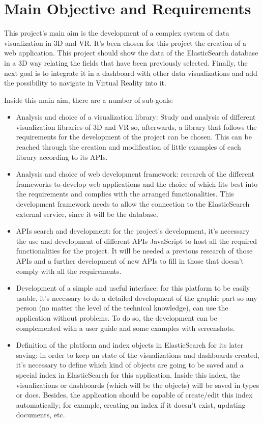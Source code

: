 \documentclass[a4paper, 12pt]{book}
\begin{document}
\section{Main Objective and Requirements}
\label{sec:mainobj}


This project's main aim is the development of a complex system of data visualization in 3D and VR. It's been chosen for this project the creation of a web application. This project should show the data of the ElasticSearch database in a 3D way relating the fields that have been previously selected. Finally, the next goal is to integrate it in a dashboard with other data visualizations and add the possibility to navigate in Virtual Reality into it.

Inside this main aim, there are a number of sub-goals:

\begin{itemize}
\item Analysis and choice of a visualization library: Study and analysis of different visualization libraries of 3D and VR so, afterwards, a library that follows the requirements for the development of the project can be chosen. This can be reached through the creation and modification of little examples of each library according to its APIs.
\item Analysis and choice of web development framework: research of the different frameworks to develop web applications and the choice of which fits best into the requirements and complies with the arranged functionalities. This development framework needs to allow the connection to the ElasticSearch external service, since it will be the database.
\item APIs search and development: for the project's development, it's necessary the use and development of different APIs JavaScript to host all the required functionalities for the project. It will be needed a previous research of those APIs and a further development of new APIs to fill in those that doesn't comply with all the requirements.
\item Development of a simple and useful interface: for this platform to be easily usable, it's necessary to do a detailed development of the graphic part so any person (no matter the level of the technical knowledge), can use the application without problems. To do so, the development can be complemented with a user guide and some examples with screenshots.
\item Definition of the platform and index objects in ElasticSearch for its later saving: in order to keep an state of the visualizations and dashboards created, it's necessary to define which kind of objects are going to be saved and a special index in ElasticSearch for this application. Inside this index, the visualizations or dashboards (which will be the objects) will be saved in types or docs. Besides, the application should be capable of create/edit this index automatically; for example, creating an index if it doesn't exist, updating documents, etc.

\end{itemize}
\end{document}
